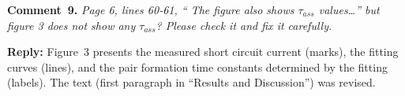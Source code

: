 \documentclass[sn-mathphys]{sn-jnl}
\begin{document}
\vspace{1cm}
\noindent
\textcolor[rgb]{0.00,0.50,1.00}{\textbf{Comment~9.}}
\emph{Page 6, lines 60-61, “ The figure also shows $\tau_{ass}$ values…” but figure 3 does not show any $\tau_{ass}$?
Please check it and fix it carefully.}

\noindent
\textcolor[rgb]{0.51,0.00,0.00}{\textbf{Reply:}}
Figure~3 presents the measured short circuit current (marks), the fitting curves (lines), and the pair formation time constants  
determined by the fitting (labels).
The text (first paragraph in ``Results and Discussion'') was revised.




\end{document}
